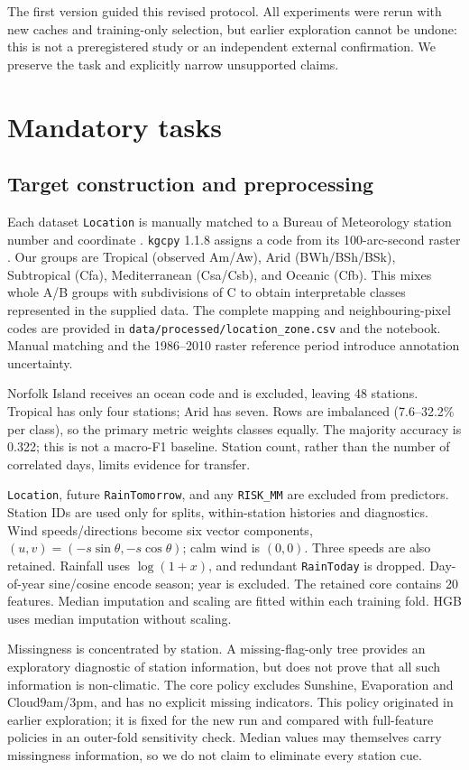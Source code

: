 \documentclass{article}
\begin{document}
The first version guided this revised protocol. All experiments were rerun with new caches and training-only selection, but earlier exploration cannot be undone: this is not a preregistered study or an independent external confirmation. We preserve the task and explicitly narrow unsupported claims.

\section{Mandatory tasks}
\subsection{Target construction and preprocessing}
Each dataset \texttt{Location} is manually matched to a Bureau of Meteorology station number and coordinate \citep{bom}. \texttt{kgcpy} 1.1.8 assigns a code from its 100-arc-second raster \citep{kgc,rubel,map}. Our groups are Tropical (observed Am/Aw), Arid (BWh/BSh/BSk), Subtropical (Cfa), Mediterranean (Csa/Csb), and Oceanic (Cfb). This mixes whole A/B groups with subdivisions of C to obtain interpretable classes represented in the supplied data. The complete mapping and neighbouring-pixel codes are provided in \texttt{data/processed/location\_zone.csv} and the notebook. Manual matching and the 1986--2010 raster reference period introduce annotation uncertainty.

Norfolk Island receives an ocean code and is excluded, leaving 48 stations. Tropical has only four stations; Arid has seven. Rows are imbalanced (7.6--32.2\% per class), so the primary metric weights classes equally. The majority accuracy is 0.322; this is not a macro-F1 baseline. Station count, rather than the number of correlated days, limits evidence for transfer.

\texttt{Location}, future \texttt{RainTomorrow}, and any \texttt{RISK\_MM} are excluded from predictors. Station IDs are used only for splits, within-station histories and diagnostics. Wind speeds/directions become six vector components, $(u,v)=(-s\sin\theta,-s\cos\theta)$; calm wind is $(0,0)$. Three speeds are also retained. Rainfall uses $\log(1+x)$, and redundant \texttt{RainToday} is dropped. Day-of-year sine/cosine encode season; year is excluded. The retained core contains 20 features. Median imputation and scaling are fitted within each training fold. HGB uses median imputation without scaling.

Missingness is concentrated by station. A missing-flag-only tree provides an exploratory diagnostic of station information, but does not prove that all such information is non-climatic. The core policy excludes Sunshine, Evaporation and Cloud9am/3pm, and has no explicit missing indicators. This policy originated in earlier exploration; it is fixed for the new run and compared with full-feature policies in an outer-fold sensitivity check. Median values may themselves carry missingness information, so we do not claim to eliminate every station cue.
\end{document}
